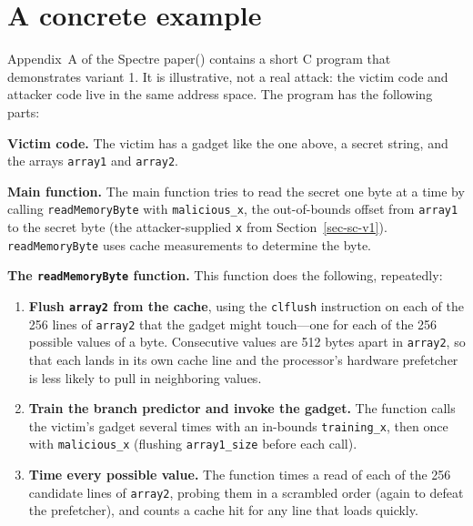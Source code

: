 \documentclass[
  letterpaper,
]{scrbook}
\theoremstyle{definition}
\theoremstyle{plain}
\theoremstyle{plain}
\theoremstyle{remark}
\begin{document}
\section{A concrete example}\label{a-concrete-example}

Appendix~A of the Spectre paper() contains a short C program that demonstrates variant 1. It is
illustrative, not a real attack: the victim code and attacker code live
in the same address space. The program has the following parts:

\textbf{Victim code.} The victim has a gadget like the one above, a
secret string, and the arrays \texttt{array1} and \texttt{array2}.
{}

\textbf{Main function.} The main function tries to read the secret one
byte at a time by calling \texttt{readMemoryByte} with
\texttt{malicious\_x}, the out-of-bounds offset from \texttt{array1} to
the secret byte (the attacker-supplied \texttt{x} from
Section~\ref{sec-sc-v1}). \texttt{readMemoryByte} uses cache
measurements to determine the byte.

\textbf{The \texttt{readMemoryByte} function.} This function does the
following, repeatedly:

\begin{enumerate}
\def\labelenumi{\arabic{enumi}.}
\item
  \textbf{Flush \texttt{array2} from the cache}, using the
  \texttt{clflush} instruction on each of the 256 lines of
  \texttt{array2} that the gadget might touch---one for each of the 256
  possible values of a byte. Consecutive values are 512 bytes apart in
  \texttt{array2}, so that each lands in its own cache line and the
  processor's hardware prefetcher is less likely to pull in neighboring
  values.
\item
  \textbf{Train the branch predictor and invoke the gadget.} The
  function calls the victim's gadget several times with an in-bounds
  \texttt{training\_x}, then once with \texttt{malicious\_x} (flushing
  \texttt{array1\_size} before each call).
  {}
\item
  \textbf{Time every possible value.} The function times a read of each
  of the 256 candidate lines of \texttt{array2}, probing them in a
  scrambled order (again to defeat the prefetcher), and counts a cache
  hit for any line that loads quickly.
\end{enumerate}
\end{document}
